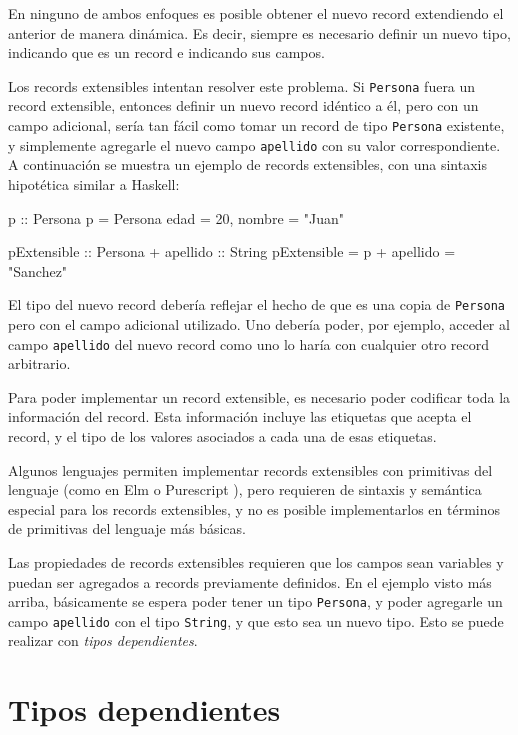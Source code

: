 En ninguno de ambos enfoques es posible obtener el nuevo record extendiendo el anterior de manera dinámica. Es decir, siempre es necesario definir un nuevo tipo, indicando que es un record e indicando sus campos.

Los records extensibles intentan resolver este problema. Si \texttt{Persona} fuera un record extensible, entonces definir un nuevo record idéntico a él, pero con un campo adicional, sería tan fácil como tomar un record de tipo \texttt{Persona} existente, y simplemente agregarle el nuevo campo \texttt{apellido} con su valor correspondiente. A continuación se muestra un ejemplo de records extensibles, con una sintaxis hipotética similar a Haskell:

\begin{code}
p :: Persona
p = Persona { edad = 20, nombre = "Juan" }

pExtensible :: Persona + { apellido :: String }
pExtensible = p + { apellido = "Sanchez" }
\end{code}

El tipo del nuevo record debería reflejar el hecho de que es una copia de \texttt{Persona} pero con el campo adicional utilizado. Uno debería poder, por ejemplo, acceder al campo \texttt{apellido} del nuevo record como uno lo haría con cualquier otro record arbitrario.

Para poder implementar un record extensible, es necesario poder codificar toda la información del record. Esta información incluye las etiquetas que acepta el record, y el tipo de los valores asociados a cada una de esas etiquetas.

Algunos lenguajes permiten implementar records extensibles con primitivas del lenguaje (como en Elm \cite{ElmRecords} o Purescript \cite{PurescriptRecords}), pero requieren de sintaxis y semántica especial para los records extensibles, y no es posible implementarlos en términos de primitivas del lenguaje más básicas.

Las propiedades de records extensibles requieren que los campos sean variables y puedan ser agregados a records previamente definidos. En el ejemplo visto más arriba, básicamente se espera poder tener un tipo \texttt{Persona}, y poder agregarle un campo \texttt{apellido} con el tipo \texttt{String}, y que esto sea un nuevo tipo. Esto se puede realizar con \textit{tipos dependientes}.

\section{Tipos dependientes}

